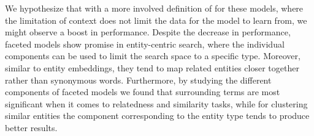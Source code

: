 We hypothesize that with a more involved definition of for these models, where the limitation of context does not limit the data for the model to learn from, we might observe a boost in performance.
Despite the decrease in performance, faceted models show promise in entity-centric search, where the individual components can be used to limit the search space to a specific type. Moreover, similar to entity embeddings, they tend to map related entities closer together rather than synonymous words. Furthermore, by studying the different components of faceted models we found that surrounding terms are most significant when it comes to relatedness and similarity tasks, while for clustering similar entities the component corresponding to the entity type tends to produce better results.

